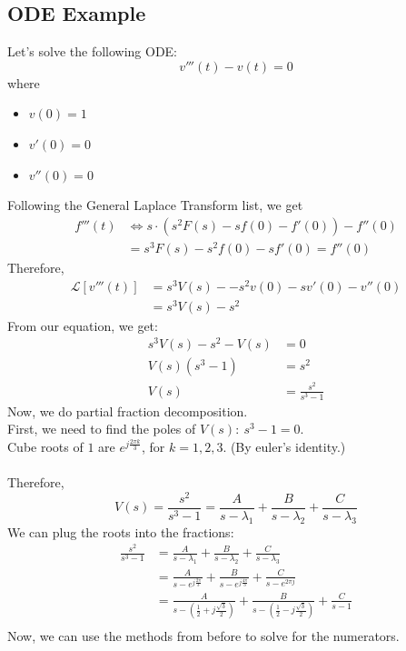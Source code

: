 \documentclass[10pt]{article}
\newcommand{\llra}{\Longleftrightarrow}
\newcommand{\laplace}{\mathcal{L}}
\begin{document}
\subsection*{ODE Example}
Let's solve the following ODE:
\[v'''(t) - v(t) = 0\]
where
\begin{itemize}
    \item $v(0) = 1$
    \item $v'(0) = 0$
    \item $v''(0) = 0$
\end{itemize}
Following the General Laplace Transform list, we get 
\begin{align*}
    f'''(t) &\llra s \cdot (s^2 F(s) - sf(0) - f'(0)) - f''(0)\\
    &= s^3 F(s) - s^2 f(0) - s f'(0) = f''(0)
\end{align*}
Therefore,
\begin{align*}
\laplace[v'''(t)] &= s^3 V(s) -- s^2 v(0) - s v'(0) - v''(0)\\
&= s^3 V(s) - s^2
\end{align*}
From our equation, we get:
\begin{align*}
    s^3 V(s) - s^2 - V(s) &= 0\\
    V(s)(s^3 - 1) &= s^2\\
    V(s) &= \frac{s^2}{s^3 - 1}
\end{align*}
Now, we do partial fraction decomposition.\\
First, we need to find the poles of $V(s): \: s^3 - 1 = 0$.\\
Cube roots of $1$ are $e^{j\frac{2\pi k}{3}}$, for $k = 1, 2, 3$.  (By euler's identity.)\\\\
Therefore,
\[V(s) = \frac{s^2}{s^3 - 1} = \frac{A}{s - \lambda_1} + \frac{B}{s - \lambda_2} + \frac{C}{s - \lambda_3}\]
We can plug the roots into the fractions:
\begin{align*}
    \frac{s^2}{s^3 - 1} &= \frac{A}{s - \lambda_1} + \frac{B}{s - \lambda_2} + \frac{C}{s - \lambda_3}\\
    &= \frac{A}{s - e^{j\frac{2\pi}{3}}} + \frac{B}{s - e^{j\frac{4\pi}{3}}} + \frac{C}{s - e^{2\pi j}}\\
    &= \frac{A}{s - (\frac{1}{2} + j\frac{\sqrt{3}}{2})} + \frac{B}{s - (\frac{1}{2} - j\frac{\sqrt{3}}{2})} + \frac{C}{s - 1}\\
\end{align*}
Now, we can use the methods from before to solve for the numerators.\\\\
\end{document}
